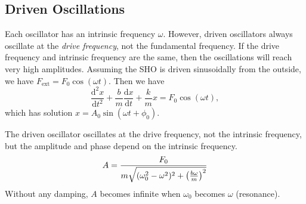 \documentclass[class=article, crop=false]{standalone}
\begin{document}
  \subsection{Driven Oscillations}
  Each oscillator has an intrinsic frequency $\omega$. However, driven oscillators always oscillate at the \emph{drive frequency}, not the fundamental frequency. If the drive frequency and intrinsic frequency are the same, then the oscillations will reach very high amplitudes. Assuming the SHO is driven sinusoidally from the outside, we have $F_{\text{ext}} = F_0\cos(\omega t)$. Then we have
  \[
    \frac{\mathrm{d}^2x}{\mathrm{d}t^2}+ \frac{b}{m}\frac{\mathrm{d}x}{\mathrm{d}t}+\frac{k}{m}x = F_0\cos(\omega t),
  \]
  which has solution $x = A_0\sin(\omega t + \phi_0)$.
  \begin{note}{}
    The driven oscillator oscillates at the drive frequency, not the intrinsic frequency, but the amplitude and phase depend on the intrinsic frequency.
    \[
      A = \frac{F_0}{m \sqrt{(\omega_0^2-\omega^2)^2 + \left( \frac{b\omega}{m} \right)^2}}
    \]
    Without any damping, $A$ becomes infinite when $\omega_0$ becomes $\omega$ (resonance).
  \end{note}
\end{document}
